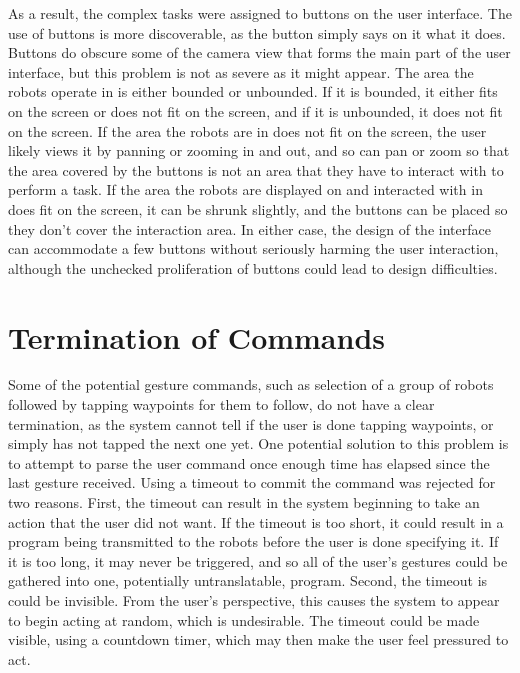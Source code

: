 As a result, the complex tasks were assigned to buttons on the user interface. 
The use of buttons is more discoverable, as the button simply says on it what it does. 
Buttons do obscure some of the camera view that forms the main part of the user interface, but this problem is not as severe as it might appear. 
The area the robots operate in is either bounded or unbounded.
If it is bounded, it either fits on the screen or does not fit on the screen, and if it is unbounded, it does not fit on the screen.
If the area the robots are in does not fit on the screen, the user likely views it by panning or zooming in and out, and so can pan or zoom so that the area covered by the buttons is not an area that they have to interact with to perform a task. 
If the area the robots are displayed on and interacted with in does fit on the screen, it can be shrunk slightly, and the buttons can be placed so they don't cover the interaction area. 
In either case, the design of the interface can accommodate a few buttons without seriously harming the user interaction, although the unchecked proliferation of buttons could lead to design difficulties. 

\section{Termination of Commands}

Some of the potential gesture commands, such as selection of a group of robots followed by tapping waypoints for them to follow, do not have a clear termination, as the system cannot tell if the user is done tapping waypoints, or simply has not tapped the next one yet. 
One potential solution to this problem is to attempt to parse the user command once enough time has elapsed since the last gesture received. 
Using a timeout to commit the command was rejected for two reasons. 
First, the timeout can result in the system beginning to take an action that the user did not want. If the timeout is too short, it could result in a program being transmitted to the robots before the user is done specifying it. 
If it is too long, it may never be triggered, and so all of the user's gestures could be gathered into one, potentially untranslatable, program. 
Second, the timeout is could be invisible. From the user's perspective, this causes the system to appear to begin acting at random, which is undesirable. 
The timeout could be made visible, using a countdown timer, which may then make the user feel pressured to act. 

